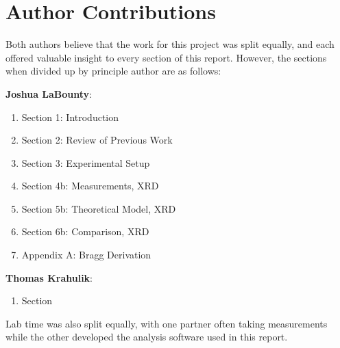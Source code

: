 \documentclass[%
 reprint,
 amsmath,amssymb,
 aps,
 pra,
]{revtex4-1}
\begin{document}
\section{Author Contributions}

Both authors believe that the work for this project was split equally, and each offered valuable insight to every section of this report. However, the sections when divided up by principle author are as follows:

\noindent \textbf{Joshua LaBounty}:
\begin{enumerate}
	\item Section 1: Introduction
	\item Section 2: Review of Previous Work
	\item Section 3: Experimental Setup
	\item Section 4b: Measurements, XRD
	\item Section 5b: Theoretical Model, XRD
	\item Section 6b: Comparison, XRD
	\item Appendix A: Bragg Derivation
\end{enumerate}

\noindent \textbf{Thomas Krahulik}:
\begin{enumerate}
	\item Section 
\end{enumerate}

\noindent Lab time was also split equally, with one partner often taking measurements while the other developed the analysis software used in this report.
\end{document}
